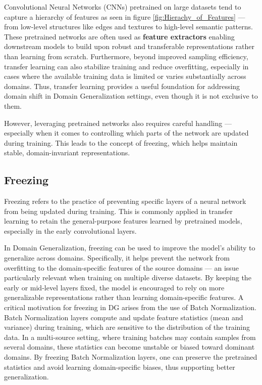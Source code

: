Convolutional Neural Networks (CNNs) pretrained on large datasets tend to capture a hierarchy of features as seen in figure \ref{fig:Hierachy_of_Features} — from low-level structures like edges and textures to high-level semantic patterns. These pretrained networks are often used as \textbf{feature extractors} enabling downstream models to build upon robust and transferable representations rather than learning from scratch. Furthermore, beyond improved sampling efficiency, transfer learning can also stabilize training and reduce overfitting, especially in cases where the available training data is limited or varies substantially across domains. Thus, transfer learning provides a useful foundation for addressing domain shift in Domain Generalization settings, even though it is not exclusive to them.

However, leveraging pretrained networks also requires careful handling — especially when it comes to controlling which parts of the network are updated during training. This leads to the concept of freezing, which helps maintain stable, domain-invariant representations.

\subsection{Freezing}
Freezing refers to the practice of preventing specific layers of a neural network from being updated during training. This is commonly applied in transfer learning to retain the general-purpose features learned by pretrained models, especially in the early convolutional layers.

In Domain Generalization, freezing can be used to improve the model's ability to generalize across domains. Specifically, it helps prevent the network from overfitting to the domain-specific features of the source domains — an issue particularly relevant when training on multiple diverse datasets. By keeping the early or mid-level layers fixed, the model is encouraged to rely on more generalizable representations rather than learning domain-specific features. A critical motivation for freezing in DG arises from the use of Batch Normalization. Batch Normalization layers compute and update feature statistics (mean and variance) during training, which are sensitive to the distribution of the training data. In a multi-source setting, where training batches may contain samples from several domains, these statistics can become unstable or biased toward dominant domains. By freezing Batch Normalization layers, one can preserve the pretrained statistics and avoid learning domain-specific biases, thus supporting better generalization. \cite{Goodfellow-et-al-2016,zhouMixStyleNeuralNetworks2023}

